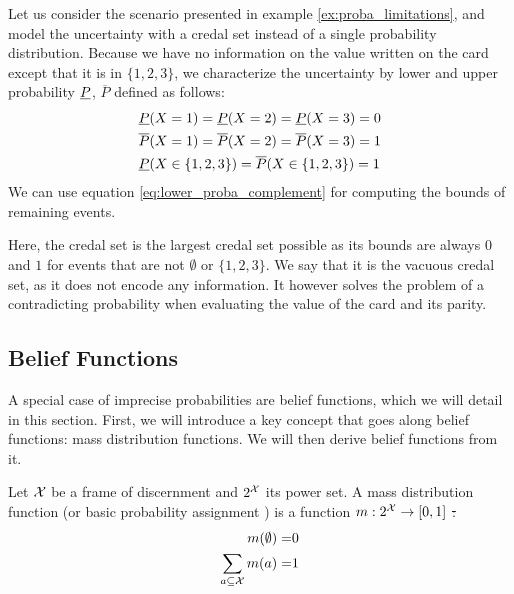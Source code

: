 \begin{example}
    Let us consider the scenario presented in example \ref{ex:proba_limitations}, and model the uncertainty with a credal set instead of a single probability distribution. Because we have no information on the value written on the card except that it is in $\{1,2,3\}$, we characterize the uncertainty by lower and upper probability ${\underline{P}}$, $\overline{P}$ defined as follows:
    \begin{align*}
        &{\underline{P}}(X=1) = {\underline{P}}(X=2)= {\underline{P}}(X=3) = 0\\
        &\overline{P}(X=1) = \overline{P}(X=2)= \overline{P}(X=3) = 1\\
        &{\underline{P}}(X\in\{1,2,3\}) = \overline{P}(X\in\{1,2,3\}) = 1
    \end{align*}
    We can use equation \eqref{eq:lower_proba_complement} for computing the bounds of remaining events.
    
    Here, the credal set is the largest credal set possible as its bounds are always $0$ and $1$ for events that are not $\emptyset$ or $\{1,2,3\}$. We say that it is the vacuous credal set, as it does not encode any information. It however solves the problem of a contradicting probability when evaluating the value of the card and its parity.
\end{example}

\subsection{Belief Functions}\label{sec:belief_functions}
A special case of imprecise probabilities are belief functions, which we will detail in this section. First, we will introduce a key concept that goes along belief functions: mass distribution functions. We will then derive belief functions from it.

\begin{definition}\label{def:mass_distribution_function}
    Let ${\mathcal{X}}$ be a frame of discernment and $2^{\mathcal{X}}$ its power set. A mass distribution function (or basic probability assignment \cite{shafer_mathematical_1976}) is a function $m:2^{\mathcal{X}}\rightarrow[0,1]$ \st:
    \begin{align}
        m(\emptyset) =& 0\label{eq:mass_emptyset}\\
        \sum_{a\subseteq{\mathcal{X}}}m(a) =& 1\label{eq:mass_whole_set}
    \end{align}
\end{definition}

